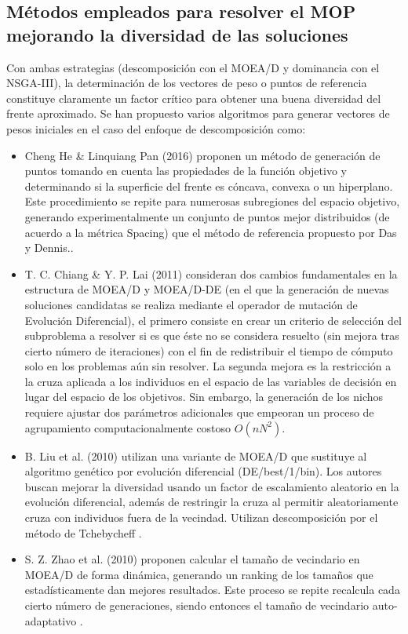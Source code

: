 \documentclass[letterpaper,10pt]{article}
\begin{document}
\subsection{Métodos empleados para resolver el MOP mejorando la diversidad de las soluciones}

Con ambas estrategias (descomposición con el MOEA/D y dominancia con el NSGA-III), la determinación de los vectores de peso o puntos de referencia constituye claramente un factor crítico para obtener una buena diversidad del frente aproximado. Se han propuesto varios algoritmos para generar vectores de pesos iniciales en el caso del enfoque de descomposición como:
\newline


\begin{itemize}
 \item Cheng He \& Linquiang Pan (2016) proponen un método de generación de puntos tomando en cuenta las propiedades de la función objetivo y determinando si la superficie del frente es cóncava, convexa o un hiperplano. Este procedimiento se repite para numerosas subregiones del espacio objetivo, generando experimentalmente un conjunto de puntos mejor distribuidos (de acuerdo a la métrica Spacing) que el método de referencia propuesto por Das y Dennis.\cite{7748353}.    
 \item T. C. Chiang \& Y. P. Lai (2011) consideran dos cambios fundamentales en la estructura de MOEA/D y MOEA/D-DE (en el que la generación de nuevas soluciones candidatas se realiza mediante el operador de mutación de Evolución Diferencial), el primero consiste en crear un criterio de selección del subproblema a resolver si es que éste no se considera resuelto (sin mejora tras cierto número de iteraciones) con el fin de redistribuir el tiempo de cómputo solo en los problemas aún sin resolver. La segunda mejora es la restricción a la cruza aplicada a los individuos en el espacio de las variables de decisión en lugar del espacio de los objetivos. Sin embargo, la generación de los nichos requiere ajustar dos parámetros adicionales que empeoran un proceso de agrupamiento computacionalmente costoso $O(nN^2)$\cite{5949789}.
 \item B. Liu et al. (2010) utilizan una variante de MOEA/D que sustituye al algoritmo genético por evolución diferencial (DE/best/1/bin). Los autores buscan mejorar la diversidad usando un factor de escalamiento aleatorio en la evolución diferencial, además de restringir la cruza al permitir aleatoriamente cruza con individuos fuera de la vecindad. Utilizan descomposición por el método de Tchebycheff \cite{5585957}.
 \item S. Z. Zhao et al. (2010) proponen calcular el tamaño de vecindario en MOEA/D de forma dinámica, generando un ranking de los tamaños que estadísticamente dan mejores resultados. Este proceso se repite recalcula cada cierto número de generaciones, siendo entonces el tamaño de vecindario auto-adaptativo \cite{6151117}.
\end{itemize}
\end{document}
